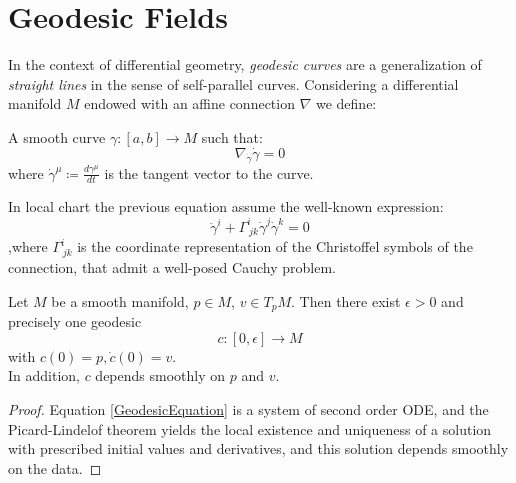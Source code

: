 \documentclass[Main]{subfiles}
\begin{document}
\setcounter{secnumdepth}{5} %
\renewcommand\thesubsubsection{\Alph{subsubsection}}
\renewcommand\theparagraph{\thesubsubsection.\alph{paragraph}}
\renewcommand\thesubparagraph{\theparagraph.\Roman{subparagraph}}

\chapter{Geodesic Fields}
	In the context of differential geometry, \emph{geodesic curves} are a generalization of \emph{straight lines}  in the sense of self-parallel curves.
	Considering a differential manifold $M$ endowed with an affine connection $\nabla$ we define:
	\begin{definition}[Geodesic]
		A smooth curve $\gamma:[a,b]\rightarrow M$ such that:
		\begin{equation}
			\nabla_{\dot{\gamma}}\dot{\gamma} =0
		\end{equation}
		where $\dot{\gamma}^\mu \coloneqq \frac{d \gamma^\mu}{d t}$ is the tangent vector to the curve.
	\end{definition}
	

		In local chart the previous equation assume the well-known expression:
		\begin{equation}\label{GeodesicEquation}
			\ddot{\gamma}^i + \Gamma^i_{\, j k} \dot{\gamma}^j \dot{\gamma}^k = 0
		\end{equation}
		,where $ \Gamma^i_{\, j k}$ is the coordinate representation of the Christoffel symbols of the connection, that admit a well-posed Cauchy problem.
		\begin{theorem}
			Let $M$ be a smooth manifold, $p\in M$, $v \in T_p M$. 
			Then there exist $\epsilon>0$ and precisely one geodesic
			\begin{displaymath}
				c: [0,\epsilon]\rightarrow M
			\end{displaymath}
			with $c(0) = p , \dot{c}(0) = v$.\\
			 In addition, $c$ depends smoothly on $p$ and $v$.
		\end{theorem}
		\begin{proof}
		Equation \ref{GeodesicEquation} is a system of second order ODE, and the Picard-Lindelof theorem yields the local existence and uniqueness of a solution with prescribed initial values and derivatives, and this solution depends smoothly on the data.
		\end{proof}
\end{document}
